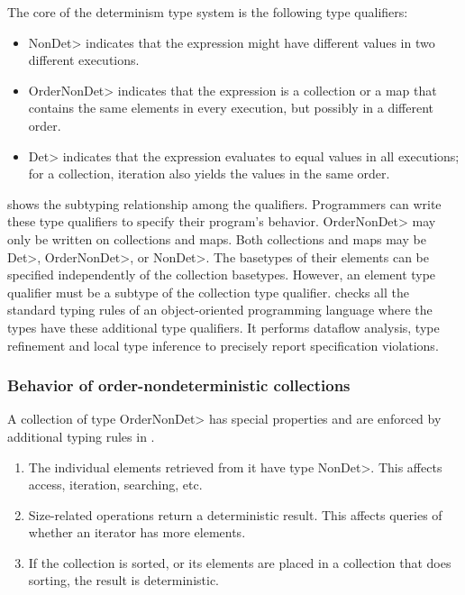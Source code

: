 The core of the determinism type system is the following type qualifiers:
\begin{itemize}
    \item \<NonDet> indicates
    that the expression might have different values in two different executions.
    \item \<OrderNonDet> indicates that the expression is a collection or
    a map that contains the same elements in every execution, but possibly
    in a different order.
    \item \<Det> indicates that the expression evaluates to equal values in
    all executions; for a collection, iteration
    also yields the values in the same order.
\end{itemize}
 shows the subtyping
relationship among the qualifiers.
Programmers can write these type qualifiers to specify their program's behavior.
\<OrderNonDet> may only be written on collections and maps.
Both collections and maps may be \<Det>, \<OrderNonDet>, or \<NonDet>.
The basetypes of their elements can be specified independently of the collection basetypes.
However, an element type qualifier must be a subtype of the collection type qualifier.
\OurTypeSystem checks all the standard typing rules of an object-oriented programming language where the types have these additional type qualifiers. It performs dataflow analysis,
type refinement and local type inference to precisely report specification violations.

\subsubsection{Behavior of order-nondeterministic collections}\label{sec:ond-behavior}
A collection of type \<OrderNonDet> has special properties and are enforced by additional typing rules in \ourTypeSystem.

\begin{enumerate}
    \item
    The individual elements retrieved from it have type \<NonDet>.  This
    affects access, iteration, searching, etc.
    \item
    Size-related operations return a deterministic result.  This affects
    queries of whether an iterator has more elements.
    \item
    If the collection is sorted, or its elements are placed in a collection
    that does sorting, the result is deterministic.
\end{enumerate}
